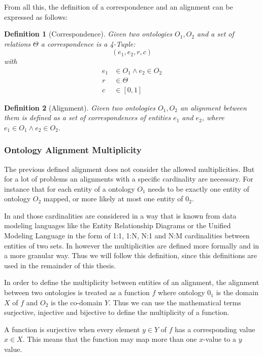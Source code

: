 \documentclass[11pt,titlepage,oneside,openany,a4paper]{report}
\newtheorem{definition}{Definition}[chapter]
\begin{document}
From all this, the definition of a correspondence and an alignment can be expressed as follows:
\begin{definition} [Correspondence] Given two ontologies $O_1,O_2$ and a set of relations $\Theta$ a correspondence is a 4-Tuple:
	\begin{equation*}
	(e_1,e_2,r,c)
	\end{equation*}
with
	\begin{eqnarray*}
	e_1 & \in O_1 \wedge  e_2 \in O_2 \\
	r & \in \Theta \\
	c & \in [0,1]
	\end{eqnarray*}
\end{definition}
\begin{definition} [Alignment] Given two ontologies $O_1, O_2$ an alignment between them is defined as a set of correspondences of entities $e_1$ and $e_2$, where $e_1 \in O_1 \wedge e_2 \in O_2$.
\end{definition}

\subsubsection{Ontology Alignment Multiplicity}
\label{sec:oa_multiplicity}
The previous defined alignment does not consider the allowed multiplicities. But for a lot of problems an alignments with a specific cardinality are necessary. For instance that for each entity of a ontology $O_1$ needs to be exactly one entity of ontology $O_2$ mapped, or more likely at most one entity of $0_2$.

In \cite{Rahm:2001} and \cite{ehrig2006ontology} those cardinalities are considered in a way that is known from data modeling languages like the Entity Relationship Diagrams or the Unified Modeling Language in the form of 1:1, 1:N, N:1 and N:M cardinalities between entities of two sets. In \cite{euzenat2013d} however the multiplicities are defined more formally and in a more granular way. Thus we will follow this definition, since this definitions are used in the remainder of this thesis.

In order to define the multiplicity between entities of an alignment, the alignment between two ontologies is treated as a function $f$ where ontology $0_1$ is the domain $X$ of $f$ and $O_2$ is the co-domain $Y$. Thus we can use the mathematical terms surjective, injective and bijective to define the multiplicity of a function.

A function is surjective when every element $y \in Y$ of $f$ has a corresponding value $x \in X$. This means that the function may map more than one $x$-value to a $y$ value.
\end{document}

